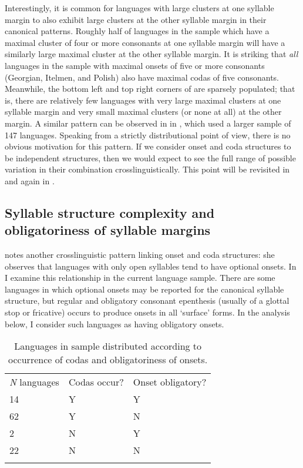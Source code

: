   Interestingly, it is common for languages with large clusters at one syllable margin to also exhibit large clusters at the other syllable margin in their canonical patterns. Roughly half of languages in the sample which have a maximal cluster of four or more consonants at one syllable margin will have a similarly large maximal cluster at the other syllable margin. It is striking that \textit{all} languages in the sample with maximal onsets of five or more consonants (Georgian, Itelmen, and Polish) also have maximal codas of five consonants. Meanwhile, the bottom left and top right corners of  are sparsely populated; that is, there are relatively few languages with very large maximal clusters at one syllable margin and very small maximal clusters (or none at all) at the other margin. A similar pattern can be observed in  in , which used a larger sample of 147 languages. Speaking from a strictly distributional point of view, there is no obvious motivation for this pattern. If we consider onset and coda structures to be independent structures, then we would expect to see the full range of possible variation in their combination crosslinguistically. This point will be revisited in  and again in .

\subsection{Syllable structure complexity and obligatoriness of syllable margins}\label{sec:3.3.3}

  \citet[336]{Blevins2006} notes another crosslinguistic pattern linking onset and coda structures: she observes that languages with only open syllables tend to have optional onsets. In  I examine this relationship in the current language sample. There are some languages in which optional onsets may be reported for the canonical syllable structure, but regular and obligatory consonant epenthesis (usually of a glottal stop or fricative) occurs to produce onsets in all ‘surface’ forms. In the analysis below, I consider such languages as having obligatory onsets.

\begin{table}
\begin{tabularx}{\textwidth}{XXX}
\lsptoprule

 \textit{N} languages & Codas occur? & Onset obligatory?\\
 14 & Y & Y\\
 62 & Y & N\\
 2 & N & Y\\
 22 & N & N\\
\lspbottomrule
\end{tabularx}
\caption{\label{tab:3.3}Languages in sample distributed according to occurrence of codas and obligatoriness of onsets.}
\end{table}

